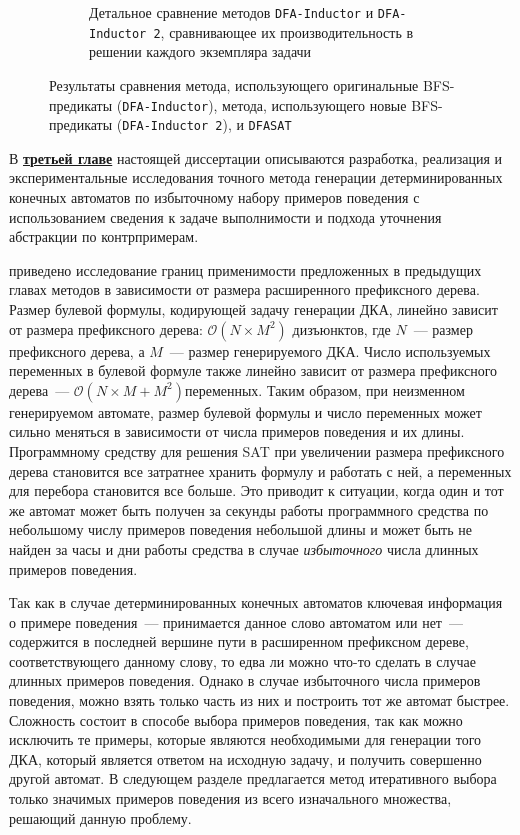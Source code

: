 \begin{figure}[ht]
\begin{subfigure}[b]{0.48\textwidth}
    \caption{Детальное сравнение методов \texttt{DFA-Inductor} и \texttt{DFA-Inductor~2}, сравнивающее их производительность в решении каждого экземпляра задачи}
    \label{syn:img:plots:scatter}
  \end{subfigure}
  \caption{Результаты сравнения метода, использующего оригинальные BFS-предикаты (\texttt{DFA-Inductor}), метода, использующего новые BFS-предикаты (\texttt{DFA-Inductor~2}), и \texttt{DFASAT}}
  \label{syn:img:plots}
\end{figure}


В \textbf{\underline{третьей главе}} настоящей диссертации описываются разработка, реализация и экспериментальные исследования точного метода генерации детерминированных конечных автоматов по избыточному набору примеров поведения с использованием сведения к задаче выполнимости и подхода уточнения абстракции по контрпримерам.

\insection{\ref{sec:cegar:motivation}} приведено исследование границ применимости предложенных в предыдущих главах методов в зависимости от размера расширенного префиксного дерева. 
Размер булевой формулы, кодирующей задачу генерации ДКА, линейно зависит от размера префиксного дерева: $\mathcal{O}\left(N \times M^{2}\right)$ дизъюнктов, где $N$~--- размер префиксного дерева, а $M$~--- размер генерируемого ДКА.
Число используемых переменных в булевой формуле также линейно зависит от размера префиксного дерева~--- $\mathcal{O}\left(N \times M + M^{2}\right) переменных.$
Таким образом, при неизменном генерируемом автомате, размер булевой формулы и число переменных может сильно меняться в зависимости от числа примеров поведения и их длины.
Программному средству для решения SAT при увеличении размера префиксного дерева становится все затратнее хранить формулу и работать с ней, а переменных для перебора становится все больше.
Это приводит к ситуации, когда один и тот же автомат может быть получен за секунды работы программного средства по небольшому числу примеров поведения небольшой длины и может быть не найден за часы и дни работы средства в случае \emph{избыточного} числа длинных примеров поведения.

Так как в случае детерминированных конечных автоматов ключевая информация о примере поведения~--- принимается данное слово автоматом или нет~--- содержится в последней вершине пути в расширенном префиксном дереве, соответствующего данному слову, то едва ли можно что-то сделать в случае длинных примеров поведения.
Однако в случае избыточного числа примеров поведения, можно взять только часть из них и построить тот же автомат быстрее.
Сложность состоит в способе выбора примеров поведения, так как можно исключить те примеры, которые являются необходимыми для генерации того ДКА, который является ответом на исходную задачу, и получить совершенно другой автомат.
В следующем разделе предлагается метод итеративного выбора только значимых примеров поведения из всего изначального множества, решающий данную проблему.

